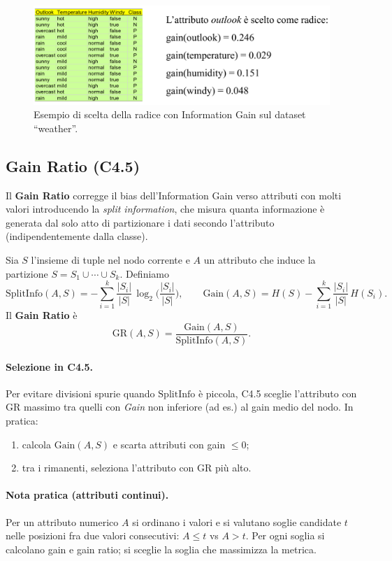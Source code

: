 \begin{figure}[htbp]
  \centering
  \includegraphics[width=.9\textwidth]{images/ig_outlook_example.png}
  \caption{Esempio di scelta della radice con Information Gain sul dataset “weather”.}
  \label{fig:ig-weather}
\end{figure}

\subsection{Gain Ratio (C4.5)}\label{subsec:gain-ratio}
Il \textbf{Gain Ratio} corregge il bias dell’Information Gain verso attributi con molti valori introducendo la \emph{split information}, che misura quanta informazione è generata dal solo atto di partizionare i dati secondo l’attributo (indipendentemente dalla classe).

Sia $S$ l’insieme di tuple nel nodo corrente e $A$ un attributo che induce la partizione $S=S_1\cup\cdots\cup S_k$. Definiamo
\[
\mathrm{SplitInfo}(A,S)
= -\sum_{i=1}^k \frac{|S_i|}{|S|}\,\log_2\!\Big(\frac{|S_i|}{|S|}\Big),
\qquad
\mathrm{Gain}(A,S)=H(S)-\sum_{i=1}^{k}\frac{|S_i|}{|S|}\,H(S_i).
\]
Il \textbf{Gain Ratio} è
\[
\mathrm{GR}(A,S)=\frac{\mathrm{Gain}(A,S)}{\mathrm{SplitInfo}(A,S)}.
\]
\paragraph{Selezione in C4.5.} Per evitare divisioni spurie quando $\mathrm{SplitInfo}$ è piccola, C4.5 sceglie l’attributo con $\mathrm{GR}$ massimo tra quelli con \emph{Gain} non inferiore (ad es.) al gain medio del nodo. In pratica:
\begin{enumerate}
  \item calcola $\mathrm{Gain}(A,S)$ e scarta attributi con gain $\le 0$;
  \item tra i rimanenti, seleziona l’attributo con $\mathrm{GR}$ più alto.
\end{enumerate} 

\paragraph{Nota pratica (attributi continui).}
Per un attributo numerico $A$ si ordinano i valori e si valutano soglie candidate $t$ nelle posizioni fra due valori consecutivi: $A\le t$ vs $A>t$. Per ogni soglia si calcolano gain e gain ratio; si sceglie la soglia che massimizza la metrica.

